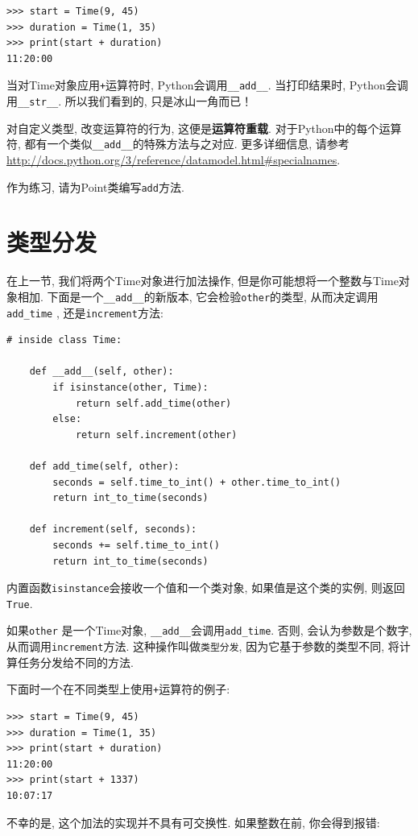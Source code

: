 \documentclass[10pt]{book}
\begin{document}
\begin{verbatim}
>>> start = Time(9, 45)
>>> duration = Time(1, 35)
>>> print(start + duration)
11:20:00
\end{verbatim}
%
当对Time对象应用{\tt +}运算符时, Python会调用\verb"__add__".
当打印结果时, Python会调用\verb"__str__".
所以我们看到的, 只是冰山一角而已！

对自定义类型, 改变运算符的行为, 这便是{\bf 运算符重载}. 
对于Python中的每个运算符, 都有一个类似\verb"__add__"的特殊方法与之对应. 
更多详细信息, 请参考
\url{http://docs.python.org/3/reference/datamodel.html#specialnames}.

作为练习, 请为Point类编写{\tt add}方法. 

\section{类型分发}

在上一节, 我们将两个Time对象进行加法操作, 
但是你可能想将一个整数与Time对象相加. 
下面是一个\verb"__add__"的新版本, 它会检验{\tt other}的类型, 
从而决定调用\verb"add_time" , 还是{\tt increment}方法:

\begin{verbatim}
# inside class Time:

    def __add__(self, other):
        if isinstance(other, Time):
            return self.add_time(other)
        else:
            return self.increment(other)

    def add_time(self, other):
        seconds = self.time_to_int() + other.time_to_int()
        return int_to_time(seconds)

    def increment(self, seconds):
        seconds += self.time_to_int()
        return int_to_time(seconds)
\end{verbatim}
%
内置函数{\tt isinstance}会接收一个值和一个类对象, 
如果值是这个类的实例, 则返回{\tt True}.

如果{\tt other} 是一个Time对象, 
\verb"__add__"会调用\verb"add_time". 
否则, 会认为参数是个数字, 从而调用{\tt increment}方法. 
这种操作叫做{\tt 类型分发}, 因为它基于参数的类型不同, 
将计算任务分发给不同的方法. 

下面时一个在不同类型上使用{\tt +}运算符的例子:

\begin{verbatim}
>>> start = Time(9, 45)
>>> duration = Time(1, 35)
>>> print(start + duration)
11:20:00
>>> print(start + 1337)
10:07:17
\end{verbatim}
%
不幸的是, 这个加法的实现并不具有可交换性. 
如果整数在前, 你会得到报错:
\end{document}
